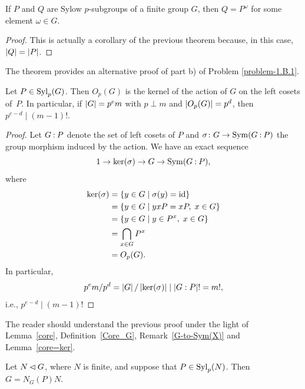\begin{thm}\label{sylow-c} {\upshape[Sylow-C]}
    If\/ $P$ and\/ $Q$ are Sylow $p$-subgroups of a finite group $G$, then $Q = P^\omega$ for some element $\omega\in G$.
\end{thm}

\begin{proof} This is actually a corollary of the previous theorem because, in this case, $\left\vert{Q}\right\vert=\left\vert{P}\right\vert$.  \end{proof}

\begin{rem}
    The theorem provides an alternative proof of part\/ {\upshape b)} of {\upshape Problem \ref{problem-1.B.1}}.
\end{rem}


\begin{cor}
    Let $P\in{\rm Syl}_p(G)$. Then $O_p(G)$ is the kernel of the action of\/ $G$ on the left cosets of\/~$P$. In particular, if $\left\vert{G}\right\vert=p^em$ with $p\perp m$ and $\left\vert{O_p(G)}\right\vert=p^d$, then $p^{e-d}\mid(m-1)!$.
\end{cor}

\begin{proof} Let $G\mathbin:P$ denote the set of left cosets of $P$ and $\sigma\colon G\to{\rm Sym}(G\mathbin:P)$ the group morphism induced by the action. We have an exact sequence
$$
    1\to \ker(\sigma)\to G\to{\rm Sym}(G\mathbin:P),
$$
where
\begin{align*}
    \ker(\sigma) &= \{y\in G\mid \sigma(y)=\operatorname{id}\}\\
        &= \{y\in G\mid yxP=xP,\; x\in G\}\\
        &= \{y\in G\mid y\in P^x,\; x\in G\}\\
        &= \bigcap_{x\in G}P^x\\
        &=O_p(G).
\end{align*}
In particular,
$$
    p^em/p^d=\left\vert{G}\right\vert/\left\vert{\ker(\sigma)}\right\vert\mid\left\vert{G:P}\right\vert!=m!,
$$
i.e., $p^{e-d}\mid(m-1)!$  \end{proof}

\begin{rem}
    The reader should understand the previous proof under the light of\/ {\upshape Lemma~\ref{core}}, {\upshape Definition~\ref{Core_G}}, {\upshape Remark~\ref{G-to-Sym(X)}} and\/ {\upshape Lemma~\ref{core=ker}}.
\end{rem}

\begin{cor}\label{frattini-argument} {}
    Let $N\lhd G$, where $N$ is finite, and suppose that $P\in{\rm Syl}_p(N)$. Then $G=N_G(P)N$.
\end{cor}

